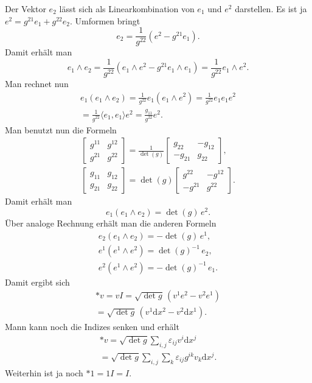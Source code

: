 \documentclass[a4paper,10pt,fleqn,twocolumn,twoside]{article}
\begin{document}
Der Vektor $e_2$ lässt sich als Linearkombination von $e_1$
und $e^2$ darstellen. Es ist ja $e^2=g^{21}e_1+g^{22}e_2$.
Umformen bringt
\[e_2 = \frac{1}{g^{22}}(e^2-g^{21}e_1).\]
Damit erhält man
\[e_1\wedge e_2
= \frac{1}{g^{22}}(e_1\wedge e^2-g^{21}e_1\wedge e_1)
= \frac{1}{g^{22}}e_1\wedge e^2.\]
Man rechnet nun
\begin{gather*}
e_1(e_1\wedge e_2) = \frac{1}{g^{22}}e_1(e_1\wedge e^2)
= \frac{1}{g^{22}}e_1e_1e^2\\
= \frac{1}{g^{22}}\langle e_1,e_1\rangle e^2
= \frac{g_{11}}{g^{22}}e^2.
\end{gather*}
Man benutzt nun die Formeln
\begin{gather*}
\begin{bmatrix}
g^{11} & g^{12}\\
g^{21} & g^{22}
\end{bmatrix}
= \frac{1}{\det(g)}
\begin{bmatrix}
g_{22} & -g_{12}\\
-g_{21} & g_{22}
\end{bmatrix},\\
\begin{bmatrix}
g_{11} & g_{12}\\
g_{21} & g_{22}
\end{bmatrix}
= \det(g)
\begin{bmatrix}
g^{22} & -g^{12}\\
-g^{21} & g^{22}
\end{bmatrix}.
\end{gather*}
Damit erhält man
\[e_1(e_1\wedge e_2) = \det(g)\,e^2.\]
Über analoge Rechnung erhält man die anderen Formeln
\begin{gather*}
e_2(e_1\wedge e_2) = -\det(g)\,e^1,\\
e^1(e^1\wedge e^2) = \det(g)^{-1}\,e_2,\\
e^2(e^1\wedge e^2) = -\det(g)^{-1}\,e_1.
\end{gather*}
Damit ergibt sich
\begin{gather*}
*v = vI = \sqrt{\det g}\,(v^1 e^2 - v^2 e^1)\\
= \sqrt{\det g}\,(v^1 \mathrm dx^2 - v^2 \mathrm dx^1).
\end{gather*}
Mann kann noch die Indizes senken und erhält
\begin{gather*}
*v = \sqrt{\det g}\sum_{i,j}\varepsilon_{ij}v^i \mathrm dx^j\\
= \sqrt{\det g}\sum_{i,j}
\sum_{k}\varepsilon_{ij}g^{ik}v_k \mathrm dx^j.
\end{gather*}
Weiterhin ist ja noch $*1 = 1I=I$.
\end{document}
